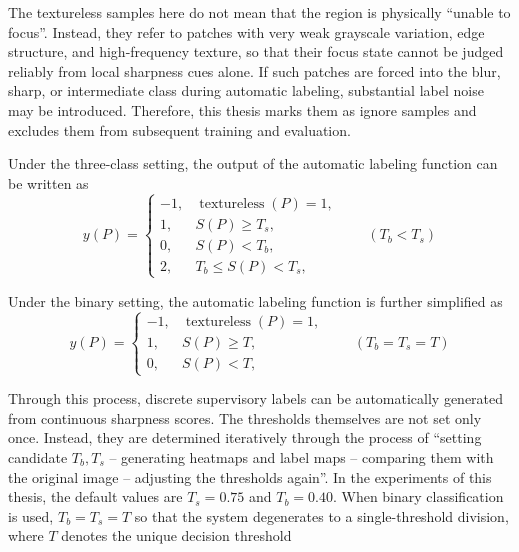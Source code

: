 \par The textureless samples here do not mean that the region is physically
``unable to focus''. Instead, they refer to patches with very weak grayscale
variation, edge structure, and high-frequency texture, so that their focus state
cannot be judged reliably from local sharpness cues alone. If such patches are
forced into the blur, sharp, or intermediate class during automatic labeling,
substantial label noise may be introduced. Therefore, this thesis marks them as
ignore samples and excludes them from subsequent training and evaluation.

\par Under the three-class setting, the output of the automatic labeling
function can be written as
\begin{equation}
    y(P)=
    \begin{cases}
        -1, & \operatorname{textureless}(P)=1, \\
        1,  & S(P)\ge T_s,                     \\
        0,  & S(P)<T_b,                        \\
        2,  & T_b\le S(P)<T_s,
    \end{cases}
    \qquad (T_b<T_s)
    \label{eq:tri-label}
\end{equation}
\par Under the binary setting, the automatic labeling function is further
simplified as
\begin{equation}
    y(P)=
    \begin{cases}
        -1, & \operatorname{textureless}(P)=1, \\
        1,  & S(P)\ge T,                       \\
        0,  & S(P)<T,
    \end{cases}
    \qquad (T_b=T_s=T)
    \label{eq:binary-label}
\end{equation}
\par Through this process, discrete supervisory labels can be automatically
generated from continuous sharpness scores. The thresholds themselves are not
set only once. Instead, they are determined iteratively through the process of
``setting candidate $T_b,T_s$ -- generating heatmaps and label maps -- comparing
them with the original image -- adjusting the thresholds again''. In the
experiments of this thesis, the default values are $T_s=0.75$ and $T_b=0.40$.
When binary classification is used, $T_b=T_s=T$ so that the system degenerates
to a single-threshold division, where $T$ denotes the unique decision threshold
